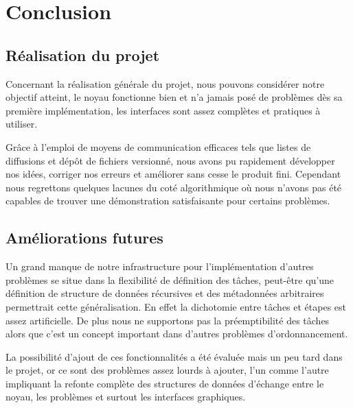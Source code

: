 \chapter{Conclusion}
\section{Réalisation du projet}
Concernant la réalisation générale du projet, nous pouvons considérer notre
objectif atteint, le noyau fonctionne bien et n'a jamais posé de problèmes
dès sa première implémentation, les interfaces sont assez complètes et pratiques
à utiliser.

Grâce à l'emploi de moyens de communication efficaces tels que
listes de diffusions et dépôt de fichiers versionné, nous avons pu rapidement
développer nos idées, corriger nos erreurs et améliorer sans cesse le produit
fini. Cependant nous regrettons quelques lacunes du coté algorithmique où
nous n'avons pas été capables de trouver une démonstration satisfaisante pour
certains problèmes.
\section{Améliorations futures}
Un grand manque de notre infrastructure pour l'implémentation d'autres problèmes
se situe dans la flexibilité de définition des tâches, peut-être qu'une
définition de structure de données récursives et des métadonnées arbitraires
permettrait cette généralisation. En effet la dichotomie entre tâches et étapes
est assez artificielle. De plus nous ne supportons pas la préemptibilité des tâches alors que c'est un concept important dans d'autres problèmes d'ordonnancement. 

La possibilité d'ajout de ces fonctionnalités a été évaluée mais un peu tard dans
le projet, or ce sont des problèmes assez lourds à ajouter, l'un comme l'autre
impliquant la refonte complète des structures de données d'échange entre le
noyau, les problèmes et surtout les interfaces graphiques.
